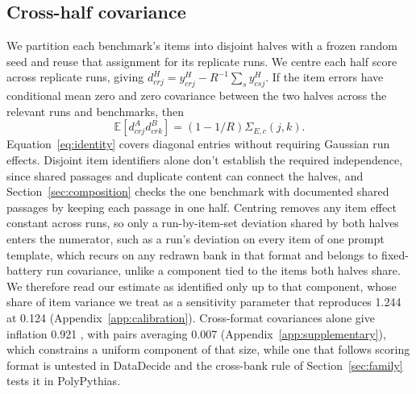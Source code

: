 \subsection{Cross-half covariance}
We partition each benchmark's items into disjoint halves with a frozen random seed and reuse that assignment for its replicate runs. We centre each half score across replicate runs, giving $d^H_{crj}=y^H_{crj}-R^{-1}\sum_s y^H_{csj}$. If the item errors have conditional mean zero and zero covariance between the two halves across the relevant runs and benchmarks, then
\begin{equation}
\mathbb{E}[d^A_{crj}d^B_{crk}]=(1-1/R)\Sigma_{E,c}(j,k).
\label{eq:identity}
\end{equation}
Equation~\ref{eq:identity} covers diagonal entries without requiring Gaussian run effects. Disjoint item identifiers alone don't establish the required independence, since shared passages and duplicate content can connect the halves, and Section~\ref{sec:composition} checks the one benchmark with documented shared passages by keeping each passage in one half. Centring removes any item effect constant across runs, so only a run-by-item-set deviation shared by both halves enters the numerator, such as a run's deviation on every item of one prompt template, which recurs on any redrawn bank in that format and belongs to fixed-battery run covariance, unlike a component tied to the items both halves share. We therefore read our estimate as identified only up to that component, whose share of item variance we treat as a sensitivity parameter that reproduces 1.244 at 0.124 (Appendix~\ref{app:calibration}). Cross-format covariances alone give inflation 0.921 , with pairs averaging 0.007 (Appendix~\ref{app:supplementary}), which constrains a uniform component of that size, while one that follows scoring format is untested in DataDecide and the cross-bank rule of Section~\ref{sec:family} tests it in PolyPythias.

